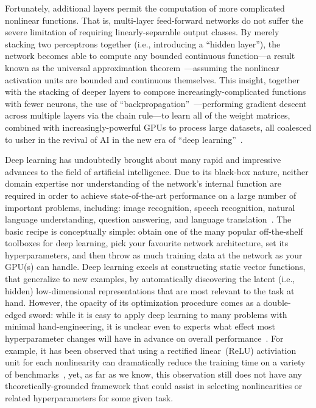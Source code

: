 Fortunately, additional layers permit the computation of more complicated nonlinear functions.
That is, multi-layer feed-forward networks do not suffer the severe limitation of requiring linearly-separable output classes.
By merely stacking two perceptrons together (i.e., introducing a ``hidden layer''), the network becomes able to compute any bounded continuous function---a result known as the universal approximation theorem~\citep{hornik1989multilayer}---assuming the nonlinear activation units are bounded and continuous themselves.
This insight, together with the stacking of deeper layers to compose increasingly-complicated functions with fewer neurons, the use of ``backpropagation''~\citep{werbos1974beyond, rumelhart1986learning}---performing gradient descent across multiple layers via the chain rule---to learn all of the weight matrices, combined with increasingly-powerful GPUs to process large datasets, all coalesced to usher in the revival of AI in the new era of ``deep learning''~\citep{sejnowski2018deep}.

Deep learning has undoubtedly brought about many rapid and impressive advances to the field of artificial intelligence.
Due to its black-box nature, neither domain expertise nor understanding of the network's internal function are required in order to achieve state-of-the-art performance on a large number of important problems, including: image recognition, speech recognition, natural language understanding, question answering, and language translation~\citep{lecun2015deep}.
The basic recipe is conceptually simple: obtain one of the many popular off-the-shelf toolboxes for deep learning, pick your favourite network architecture, set its hyperparameters, and then throw as much training data at the network as your GPU(s) can handle.
Deep learning excels at constructing static vector functions, that generalize to new examples, by automatically discovering the latent (i.e., hidden) low-dimensional representations that are most relevant to the task at hand.
However, the opacity of its optimization procedure comes as a double-edged sword: while it is easy to apply deep learning to many problems with minimal hand-engineering, it is unclear even to experts what effect most hyperparameter changes will have in advance on overall performance~\citep{bergstra2012random}.
For example, it has been observed that using a rectified linear~(ReLU) activiation unit for each nonlinearity can dramatically reduce the training time on a variety of benchmarks~\citep{glorot2011deep}, yet, as far as we know, this observation still does not have any theoretically-grounded framework that could assist in selecting nonlinearities or related hyperparameters for some given task.


